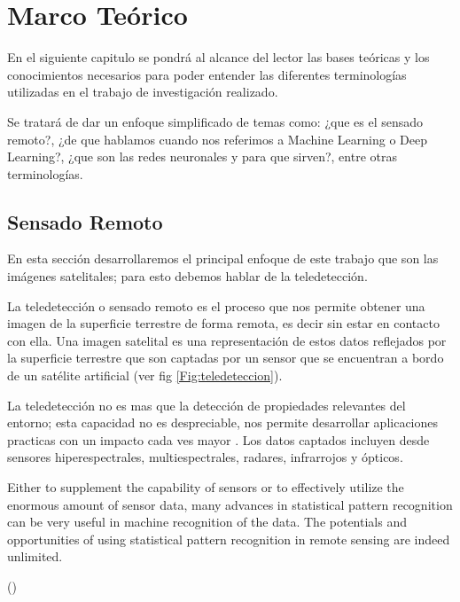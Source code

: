 \chapter{Marco Teórico} \label{chap:marcoteorico}

En el siguiente capitulo se pondrá al alcance del lector las bases teóricas y los conocimientos necesarios para poder entender las diferentes terminologías utilizadas en el trabajo de investigación realizado.

Se tratará de dar un enfoque simplificado de temas como: ¿que es el sensado remoto?, ¿de que hablamos cuando nos referimos a Machine Learning o Deep Learning?, ¿que son las redes neuronales y para que sirven?, entre otras terminologías.

\section{Sensado Remoto}\label{sec:sensadoremoto}

En esta sección desarrollaremos el principal enfoque de este trabajo que son las imágenes satelitales; para esto debemos hablar de la teledetección.

La teledetección o sensado remoto es el proceso que nos permite obtener una imagen de la superficie terrestre de forma remota, es decir sin estar en contacto con ella. Una imagen satelital es una representación de estos datos reflejados por la superficie terrestre que son captadas por un sensor que se encuentran a bordo de un satélite artificial (ver fig \ref{Fig:teledeteccion}).

La teledetección no es mas que la detección de propiedades relevantes del entorno; esta capacidad no es despreciable, nos permite desarrollar aplicaciones practicas con un impacto cada ves mayor \citep{percepcion}. Los datos captados incluyen desde sensores hiperespectrales, multiespectrales, radares, infrarrojos y ópticos.

\begin{center} \begin{minipage}{0.8\linewidth}  \vspace{5pt} {\small
Either to supplement the capability of sensors or to effectively utilize the enormous amount of sensor data, many advances in statistical pattern recognition can be very useful in machine recognition of the data. The potentials and opportunities of using statistical pattern recognition in remote sensing are indeed unlimited.}
\begin{flushright} (\citeauthor{Ledda})
\end{flushright}
\end{minipage}
\end{center}

